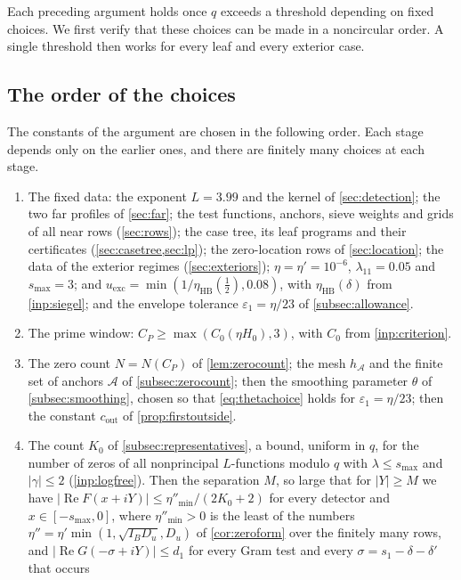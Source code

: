 \documentclass[11pt]{amsart}
\numberwithin{equation}{section}
\theoremstyle{plain}
\theoremstyle{definition}
\theoremstyle{remark}
\renewcommand{\Re}{\operatorname{Re}}
\newcommand{\eps}{\varepsilon}
\newcommand{\1}{\mathbf{1}}
\begin{document}
Each preceding argument holds once $q$ exceeds a threshold depending on fixed choices.
We first verify that these choices can be made in a noncircular order. A single
threshold then works for every leaf and every exterior case.

\subsection{The order of the choices}\label{subsec:order}
The constants of the argument are chosen in the following order. Each stage depends only on the
earlier ones, and there are finitely many choices at each stage.
\begin{enumerate}[(S1)]
  \item The fixed data: the exponent $L=3.99$ and the kernel of \cref{sec:detection}; the two far
    profiles of \cref{sec:far}; the test functions, anchors, sieve weights and grids of all near
    rows (\cref{sec:rows}); the case tree, its leaf programs and their certificates
    (\cref{sec:casetree,sec:lp}); the zero-location rows of \cref{sec:location}; the data of the
    exterior regimes (\cref{sec:exteriors}); $\eta=\eta'=10^{-6}$, $\lambda_{11}=0.05$ and $s_{\max}=3$; and
    $u_{\mathrm{exc}}=\min(1/\eta_{\mathrm{HB}}(\frac12),0.08)$, with $\eta_{\mathrm{HB}}(\delta)$ from \cref{inp:siegel}; and the envelope tolerance
$\eps_1=\eta/23$ of \cref{subsec:allowance}.
  \item The prime window: $C_P\ge\max(C_0(\eta H_0),3)$, with $C_0$ from \cref{inp:criterion}.
  \item The zero count $N=N(C_P)$ of \cref{lem:zerocount}; the mesh $h_{\mathcal A}$ and the finite set
    of anchors $\mathcal A$ of \cref{subsec:zerocount}; then the smoothing parameter $\theta$ of
    \cref{subsec:smoothing}, chosen so that \eqref{eq:thetachoice} holds for $\eps_1=\eta/23$; then the
    constant $c_{\mathrm{out}}$ of \cref{prop:firstoutside}.
  \item The count $K_0$ of \cref{subsec:representatives}, a bound, uniform in $q$, for the number
    of zeros of all nonprincipal $L$-functions modulo $q$ with $\lambda\le s_{\max}$ and $|\gamma|\le2$
    (\cref{inp:logfree}). Then the separation $M$, so large that for $|Y|\ge M$ we have
    $|\Re F(x+iY)|\le\eta''_{\min}/(2K_0+2)$ for every detector and $x\in[-s_{\max},0]$, where
    $\eta''_{\min}>0$ is the least of the numbers $\eta''=\eta'\min(1,\sqrt{I_BD_u},D_u)$ of
    \cref{cor:zeroform} over the finitely many rows, and
    $|\Re G(-\sigma+iY)|\le d_1$ for every Gram test and every $\sigma=s_1-\delta-\delta'$ that occurs

\end{enumerate}
\end{document}
